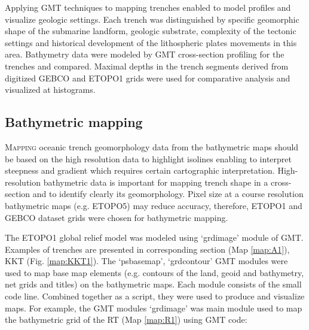 \documentclass[11pt,a4paper]{report}
\begin{document}
{Applying \ac{GMT} techniques to mapping trenches enabled to model profiles and visualize geologic settings. Each trench was distinguished by specific geomorphic shape of the submarine landform, geologic substrate, complexity of the tectonic settings and historical development of the lithospheric plates movements in this area. Bathymetry data were modeled by \ac{GMT} cross-section profiling for the trenches and compared. Maximal depths in the trench segments derived from digitized \ac{GEBCO} and \ac{ETOPO1} grids were used for comparative analysis and visualized at histograms. 

\pagebreak
\subsection{Bathymetric mapping}
\lettrine[lines=3]{\color{Magenta4}M}{apping} oceanic trench geomorphology data from the bathymetric maps should be based on the high resolution data to highlight isolines enabling to interpret steepness and gradient which requires certain cartographic interpretation. High-resolution bathymetric data is important  for mapping trench shape in a cross-section and to identify clearly its geomorphology. Pixel size at a course resolution bathymetric maps (e.g. \ac{ETOPO5}) may reduce accuracy, therefore, \ac{ETOPO1} and \ac{GEBCO} dataset grids were chosen for bathymetric mapping.

The \ac{ETOPO1} global relief model was modeled using ‘grdimage’ module of \ac{GMT}. Examples of trenches are presented in corresponding section (Map \ref{map:A1}), \ac{KKT} (Fig. \ref{map:KKT1}).
The ‘psbasemap’, ‘grdcontour’ \ac{GMT} modules were used to map base map elements (e.g. contours of the land, geoid and bathymetry, net grids and titles) on the bathymetric maps. Each module consists of the small code line. Combined together as a script, they were used to produce and visualize maps. For example, the \ac{GMT} modules ‘grdimage’ was main module used to map the bathymetric grid of the \ac{RT} (Map \ref{map:R1}) using \ac{GMT} code: 

}
\end{document}
